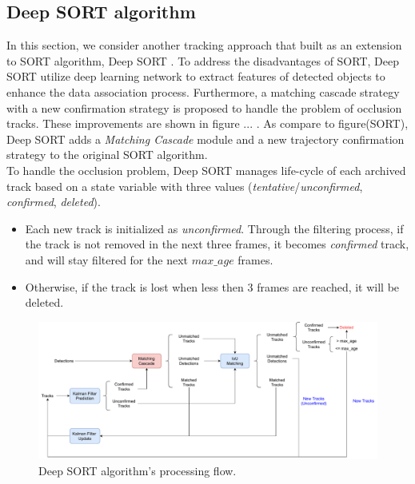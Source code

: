 \subsection{Deep SORT algorithm}
\label{sec:deep_sort}
In this section, we consider another tracking approach that built as an extension to SORT algorithm, Deep SORT \cite{wojke2017simple}. To address the disadvantages of SORT, Deep SORT utilize deep learning network to extract features of detected objects to enhance the data association process. Furthermore, a matching cascade strategy with a new confirmation strategy is proposed to handle the problem of occlusion tracks. These improvements are shown in figure ... .
As compare to figure(SORT), Deep SORT adds a \textit{Matching Cascade} module and a new trajectory confirmation strategy to the original SORT algorithm. \\
To handle the occlusion problem, Deep SORT manages life-cycle of each archived track based on a state variable with three values (\textit{tentative}/\textit{unconfirmed}, \textit{confirmed}, \textit{deleted}). 
\begin{itemize}
    \item Each new track is initialized as \textit{unconfirmed}. Through the filtering process, if the track is not removed in the next three frames, it becomes \textit{confirmed} track, and will stay filtered for the next $max\_age$ frames.
    \item Otherwise, if the track is lost when less then 3 frames are reached, it will be deleted.
\end{itemize}

\begin{figure}[t!]
    \centering
    \includegraphics[width=\textwidth]{resources/images/DeepSORT.pdf}
    \caption{Deep SORT algorithm's processing flow.}
    \label{fig:DeepSORT_overview}
\end{figure}

